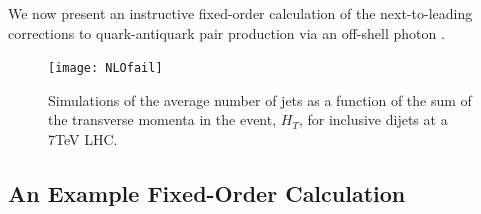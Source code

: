 		We now present an instructive fixed-order calculation of the next-to-leading corrections to quark-antiquark pair
		production via an off-shell photon \cite{fieldBook}.

		\begin{figure}[hbt]
			\centering
			\texttt{[image: NLOfail]}
			\caption{Simulations of the average number of jets as a function of the sum of the transverse momenta in the event, $H_T$,
			         for inclusive dijets at a 7TeV LHC.}
			\label{fig:NLO3jets}
  		\end{figure}

	\subsection{An Example Fixed-Order Calculation}
		\label{sub:eg1loop}


